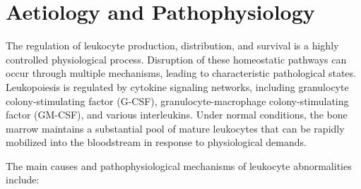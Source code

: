\section*{Aetiology and Pathophysiology}
The regulation of leukocyte production, distribution, and survival is a highly controlled physiological process. Disruption of these homeostatic pathways can occur through multiple mechanisms, leading to characteristic pathological states. Leukopoiesis is regulated by cytokine signaling networks, including granulocyte colony-stimulating factor (G-CSF), granulocyte-macrophage colony-stimulating factor (GM-CSF), and various interleukins. Under normal conditions, the bone marrow maintains a substantial pool of mature leukocytes that can be rapidly mobilized into the bloodstream in response to physiological demands.

The main causes and pathophysiological mechanisms of leukocyte abnormalities include:
